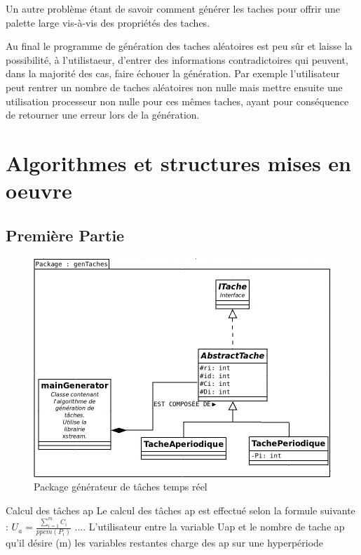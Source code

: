 Un autre problème étant de savoir comment générer les taches pour offrir une palette large vis-à-vis des propriétés des taches.

Au final le programme de génération des taches aléatoires est peu sûr et laisse la possibilité, à l'utilistaeur, d'entrer des informations contradictoires qui peuvent, dans la majorité des cas, faire échouer la génération.
Par exemple l'utilisateur peut rentrer un nombre de taches aléatoires non nulle mais mettre ensuite une utilisation processeur non nulle pour ces mêmes taches, ayant pour conséquence de retourner une erreur lors de la génération.


\section{Algorithmes et structures mises en oeuvre}
\subsection{Première Partie}
   \begin{figure}[htbp]
  \centering
  \includegraphics[scale=0.60]{img/packgen}
  \caption{Package générateur de tâches temps réel}
  \label{fig:gen}
\end{figure}

Calcul des tâches ap  
Le calcul des tâches ap est effectué selon la formule suivante : $ U_a =  \frac{\sum_{i=1}^m C_i}{ppcm(P_i)}$   ....  L'utilisateur entre la variable Uap  et le nombre de tache ap qu'il désire (m) les variables restantes 
charge des ap sur une hyperpériode 

